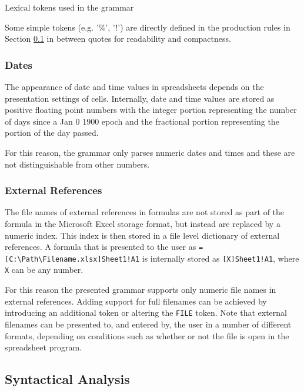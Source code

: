 \documentclass[times]{smrauth}
\begin{document}
\begin{table}
	\vspace{2mm}
	\caption{Lexical tokens used in the grammar}
	\label{table:tokens}
	\centering
	
\end{table}

Some simple tokens (e.g. '\%', '!') are directly defined in the production rules in Section \ref{subsection:productionRules} in between quotes for readability and compactness.

\subsubsection{\textbf{Dates}}

The appearance of date and time values in spreadsheets depends on the presentation settings of cells. Internally, date and time values are stored as positive floating point numbers with the integer portion representing the number of days since a Jan 0 1900 epoch and the fractional portion representing the portion of the day passed.

For this reason, the grammar only parses numeric dates and times and these are not distinguishable from other numbers.

\subsubsection{\textbf{External References}}
\label{section:externalReferences}
The file names of external references in formulas are not stored as part of the formula in the Microsoft Excel storage format, but instead are replaced by a numeric index.
This index is then stored in a file level dictionary of external references.
A formula that is presented to the user as \texttt{=[C:\textbackslash Path\textbackslash Filename.xlsx]Sheet1!A1} is internally stored as \texttt{[X]Sheet1!A1}, where \texttt{X} can be any number.

For this reason the presented grammar supports only numeric file names in external references.
Adding support for full filenames can be achieved by introducing an additional token or altering the \texttt{FILE} token. Note that external filenames can be presented to, and entered by, the user in a number of different formats, depending on conditions such as whether or not the file is open in the spreadsheet program.

\subsection{Syntactical Analysis}
\label{subsection:productionRules}
\end{document}
